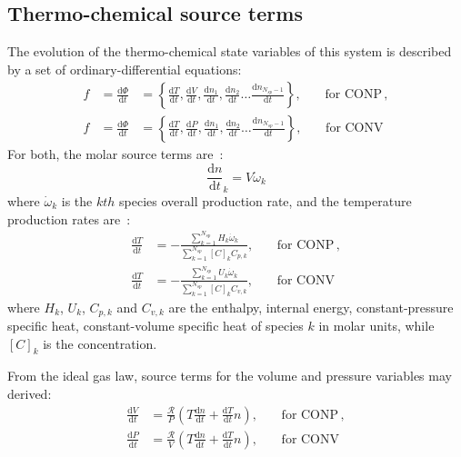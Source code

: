 \documentclass[12pt]{article}
\newcommand{\ns}{\ensuremath{{N_{sp}}}}
\newcommand{\conp}{CONP}
\newcommand{\conv}{CONV}
\newcommand{\dconp}{\ensuremath{,\qquad\text{for \conp}}}
\newcommand{\dconv}{\ensuremath{,\qquad\text{for \conv}}}
\newcommand{\Ru}{\ensuremath{\mathcal{R}}}
\begin{document}
\subsection{Thermo-chemical source terms}
The evolution of the thermo-chemical state variables of this system is described by a set of ordinary-differential equations:
\begin{subequations}
\label{e:source_terms}
\begin{align}
f &= \frac{\text{d} \Phi }{\text{d} t } &= \left\{\frac{\text{d} T }{\text{d} t },\frac{\text{d} V }{\text{d} t },\frac{\text{d} n_1}{\text{d} t },\frac{\text{d} n_2 }{\text{d} t }\ldots \frac{\text{d} n_{\ns - 1} }{\text{d} t }\right\}\dconp, \\
f &= \frac{\text{d} \Phi }{\text{d} t } &= \left\{\frac{\text{d} T }{\text{d} t },\frac{\text{d} P }{\text{d} t },\frac{\text{d} n_1}{\text{d} t },\frac{\text{d} n_2 }{\text{d} t }\ldots \frac{\text{d} n_{\ns - 1} }{\text{d} t }\right\}\dconv 
\end{align}
\end{subequations}
For both, the molar source terms are~\cite{TurnsStephenR2012Aitc}:
\begin{equation}
\frac{\text{d} n }{\text{d} t }_{k} = V \dot{\omega}_{k}
\label{source:spec}
\end{equation}
where $\dot{\omega}_k$ is the $kth$ species overall production rate, and the temperature production rates are~\cite{TurnsStephenR2012Aitc}:
\begin{subequations}
\label{source:temperature_incomplete}
\begin{align}
\frac{\text{d} T }{\text{d} t } &= - \frac{\sum_{k=1}^{\ns} H_{k} \dot{\omega}_{k}}{\sum_{k=1}^{\ns} [C]_{k} {C_{p, k}}}\dconp, \\
\frac{\text{d} T }{\text{d} t } &= - \frac{\sum_{k=1}^{\ns} U_{k} \dot{\omega}_{k}}{\sum_{k=1}^{\ns} [C]_{k} {C_{v, k}}}\dconv
\end{align}
\end{subequations}
where $H_k$, $U_k$, $C_{p,k}$ and $C_{v, k}$ are the enthalpy, internal energy, constant-pressure specific heat, constant-volume specific heat of species $k$ in molar units, while $[C]_{k}$ is the concentration.

From the ideal gas law, source terms for the volume and pressure variables may derived:
\begin{subequations}
\label{source:param_incomplete}
\begin{align}
\frac{\text{d} V }{\text{d} t } &= \frac{\Ru}{P} \left(T \frac{\text{d} n }{\text{d} t } + \frac{\text{d} T }{\text{d} t } n\right)\dconp, \\
\frac{\text{d} P }{\text{d} t } &= \frac{\Ru}{V} \left(T \frac{\text{d} n }{\text{d} t } + \frac{\text{d} T }{\text{d} t } n\right)\dconv
\end{align}
\end{subequations}
\end{document}
